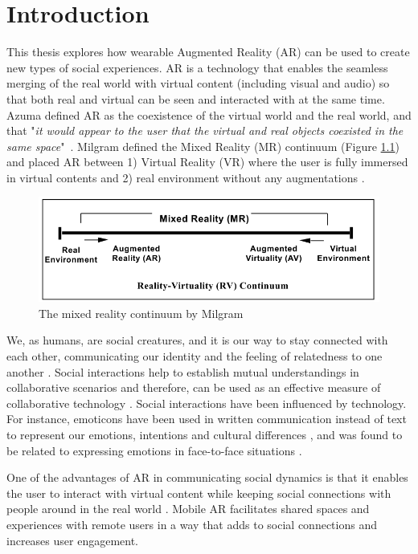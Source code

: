 \chapter{Introduction}
\label{ch:intro}

This thesis explores how wearable Augmented Reality (AR) can be used to create new types of social experiences. AR is a technology that enables the seamless merging of the real world with virtual content (including visual and audio) so that both real and virtual can be seen and interacted with at the same time. Azuma defined AR as the coexistence of the virtual world and the real world, and that "\textit{it would appear to the user that the virtual and real objects coexisted in the same space}"~\cite{azuma1997survey}. Milgram defined the Mixed Reality (MR) continuum (Figure \ref{fig:mr-continuum}) and placed AR between 1) Virtual Reality (VR) where the user is fully immersed in virtual contents and 2) real environment without any augmentations \cite{Milgram1995a}. 

\begin{figure}[H]
    \centering
    \includegraphics[width=0.8\linewidth]{images/10-intro/mixed-reality-continuum.png}
    \caption{The mixed reality continuum by Milgram \cite{Milgram1995a}}
    \label{fig:mr-continuum}
\end{figure}

We, as humans, are social creatures, and it is our way to stay connected with each other, communicating our identity and the feeling of relatedness to one another \cite{HuangWeidong2013}. Social interactions help to establish mutual understandings in collaborative scenarios and therefore, can be used as an effective measure of collaborative technology \cite{Li2013}. Social interactions have been influenced by technology. For instance, emoticons have been used in written communication instead of text to represent our emotions, intentions and cultural differences \cite{Pavalanathan2016}, and was found to be related to expressing emotions in face-to-face situations \cite{Derks2007}. 

One of the advantages of AR in communicating social dynamics is that it enables the user to interact with virtual content while keeping social connections with people around in the real world \cite{HuangWeidong2013}. Mobile AR facilitates shared spaces and experiences with remote users in a way that adds to social connections and increases user engagement. 


